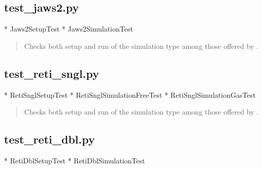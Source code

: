 \documentclass[letterpaper,10pt,english]{sphinxmanual}
\begin{document}
\begin{quote}

\end{quote}


\subsection{test\_jaws2.py}
\label{\detokenize{testsuite:test-jaws2-py}}
* Jaws2SetupTest
* Jaws2SimulationTest

\begin{quote}

Checks both setup and run of the  simulation type among those offered by .
\end{quote}

\begin{quote}

\end{quote}


\subsection{test\_reti\_sngl.py}
\label{\detokenize{testsuite:test-reti-sngl-py}}
* RetiSnglSetupTest
* RetiSnglSimulationFreeTest
* RetiSnglSimulationGasTest

\begin{quote}

Checks both setup and run of the  simulation type among those offered by .
\end{quote}

\begin{quote}

\end{quote}


\subsection{test\_reti\_dbl.py}
\label{\detokenize{testsuite:test-reti-dbl-py}}
* RetiDblSetupTest
* RetiDblSimulationTest
\end{document}
